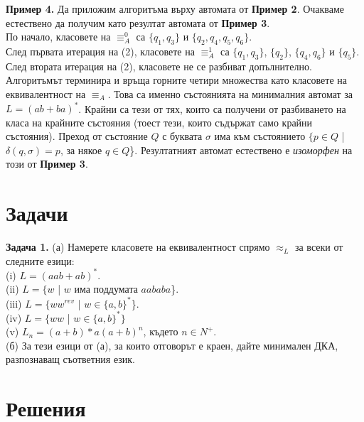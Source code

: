 \documentclass{article}
\begin{document}
    \vspace{15pt}

    \textbf{Пример 4.} Да приложим алгоритъма върху автомата от
    \textbf{Пример 2}. Очакваме естествено да получим като резултат автомата от 
    \textbf{Пример 3}. \\
    \vspace{10pt}
    По начало, класовете на $\equiv_A^0$ са $\{q_1,q_3\}$ и $\{q_2,q_4,q_5,q_6\}$. \\
    \vspace{10pt}
    След първата итерация на (2), класовете на $\equiv_A^1$ са $\{q_1,q_3\}$, $\{q_2\}$,
    $\{q_4,q_6\}$ и $\{q_5\}$. \\
    \vspace{10pt}
    След втората итерация на (2), класовете не се разбиват допълнително. Алгоритъмът
    терминира и връща горните четири множества като класовете на еквивалентност на 
    $\equiv_A$. Това са именно състоянията на минималния автомат за $L = (ab + ba)^*$.
    Крайни са тези от тях, които са получени от разбиването на класа на крайните 
    състояния (тоест тези, които съдържат само крайни състояния). Преход от състояние
    $Q$ с буквата $\sigma$ има към състоянието $\{p \in Q$ | $\delta(q,\sigma) = p$, за някое $q \in Q$\}.
    Резултатният автомат естествено е \textit{изоморфен} на този от \textbf{Пример 3}.
    
    \begin{center}
    \end{center}

\section{Задачи}
    \textbf{Задача 1.} (а) Намерете класовете на еквивалентност спрямо $\approx_L$ за 
    всеки от следните езици: \\
    (i) $L = (aab + ab)^*$.\\
    (ii) $L = \{w$ | $w$ има поддумата $aababa$\}.\\
    (iii) $L = \{ww^{rev}$ | $w \in \{a,b\}^*$\}.\\
    (iv) $L = \{ww$ | $w \in \{a,b\}^*\}$\\
    (v) $L_n = (a+b)*a(a+b)^n$, където $n \in N^+$. \\
    
    (б) За тези езици от (а), за които отговорът е краен, дайте минимален ДКА, разпознаващ
    съответния език.



\vspace{25pt}

\section{Решения}
    
\end{document}
